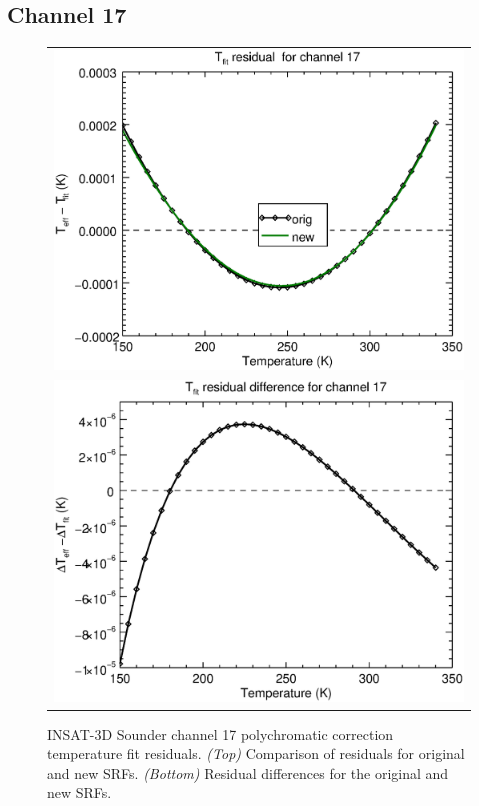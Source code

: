 \subsection{Channel 17}
\begin{figure}[H]
  \centering
  \begin{tabular}{c}
    \includegraphics[scale=0.55]{graphics/sndr/tfit/sndr_insat3d-17.tfit.eps} \\
    \includegraphics[scale=0.55]{graphics/sndr/tfit/sndr_insat3d-17.tfit.difference.eps}
  \end{tabular}
  \caption{INSAT-3D Sounder channel 17 polychromatic correction temperature fit residuals. \emph{(Top)} Comparison of residuals for original and new SRFs. \emph{(Bottom)} Residual differences for the original and new SRFs.}
  \label{fig:sndr_ch17_tfit}
\end{figure}

